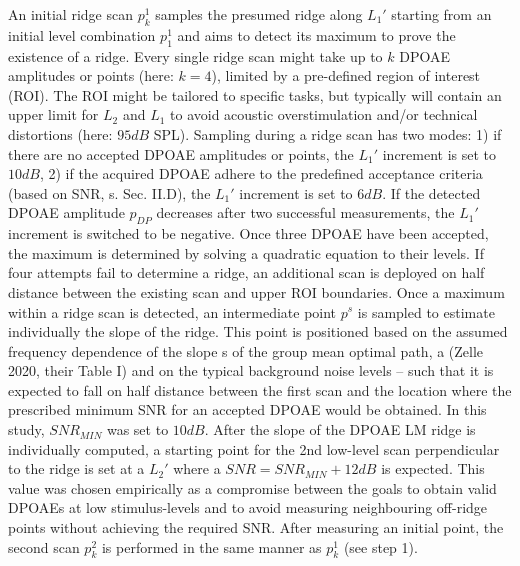 \documentclass[journal,twoside,web]{ieeecolor2}
\begin{document}
\begin{algorithmic}[1]
\STATE An initial ridge scan $p_k^1$ samples the presumed ridge along $L_1'$ starting from an initial level combination $p_1^1$ and aims to detect its maximum to prove the existence of a ridge. Every single ridge scan might take up to $k$ DPOAE amplitudes or points (here: $k=4$), limited by a pre-defined region of interest (ROI). The ROI might be tailored to specific tasks, but typically will contain an upper limit for $L_2$ and $L_1$ to avoid acoustic overstimulation and/or technical distortions (here: $95 dB$ SPL). Sampling during a ridge scan has two modes: 1) if there are no accepted DPOAE amplitudes or points, the $L_1'$ increment is set to $10 dB$, 2) if the acquired DPOAE adhere to the predefined acceptance criteria (based on SNR, s. Sec. II.D), the $L_1'$ increment is set to $6 dB$. If the detected DPOAE amplitude $p_{DP}$ decreases after two successful measurements, the $L_1'$ increment is switched to be negative. Once three DPOAE have been accepted, the maximum is determined by solving a quadratic equation to their levels. If four attempts fail to determine a ridge, an additional scan is deployed on half distance between the existing scan and upper ROI boundaries.
\STATE Once a maximum within a ridge scan is detected, an intermediate point $p^s$ is sampled to estimate individually the slope of the ridge. This point is positioned based on the assumed frequency dependence of the slope s of the group mean optimal path, a (Zelle 2020, their Table I) and on the typical background noise levels – such that it is expected to fall on half distance between the first scan and the location where the prescribed minimum SNR for an accepted DPOAE would be obtained. In this study, $SNR_{MIN}$ was set to $10 dB$.
\STATE After the slope of the DPOAE LM ridge is individually computed, a starting point for the 2nd low-level scan perpendicular to the ridge is set at a $L_2'$ where a $SNR = SNR_{MIN} + 12 dB$ is expected. This value was chosen empirically as a compromise between the goals to obtain valid DPOAEs at low stimulus-levels and to avoid measuring neighbouring off-ridge points without achieving the required SNR. After measuring an initial point, the second scan $p_k^2$ is performed in the same manner as $p_k^1$ (see step 1).
\end{algorithmic} 
\end{document}
